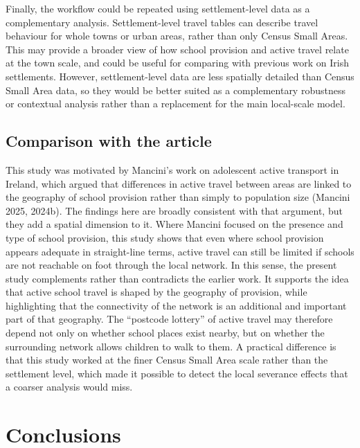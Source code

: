 \documentclass{article}
\begin{document}
Finally, the workflow could be repeated using settlement-level data as a
complementary analysis. Settlement-level travel tables can describe
travel behaviour for whole towns or urban areas, rather than only Census
Small Areas. This may provide a broader view of how school provision and
active travel relate at the town scale, and could be useful for
comparing with previous work on Irish settlements. However,
settlement-level data are less spatially detailed than Census Small Area
data, so they would be better suited as a complementary robustness or
contextual analysis rather than a replacement for the main local-scale
model.

\subsection{Comparison with the
article}\label{comparison-with-the-article}

This study was motivated by Mancini's work on adolescent active
transport in Ireland, which argued that differences in active travel
between areas are linked to the geography of school provision rather
than simply to population size (Mancini 2025, 2024b). The findings here
are broadly consistent with that argument, but they add a spatial
dimension to it. Where Mancini focused on the presence and type of
school provision, this study shows that even where school provision
appears adequate in straight-line terms, active travel can still be
limited if schools are not reachable on foot through the local network.
In this sense, the present study complements rather than contradicts the
earlier work. It supports the idea that active school travel is shaped
by the geography of provision, while highlighting that the connectivity
of the network is an additional and important part of that geography.
The ``postcode lottery'' of active travel may therefore depend not only
on whether school places exist nearby, but on whether the surrounding
network allows children to walk to them. A practical difference is that
this study worked at the finer Census Small Area scale rather than the
settlement level, which made it possible to detect the local severance
effects that a coarser analysis would miss.

\section{Conclusions}\label{conclusions}
\end{document}
